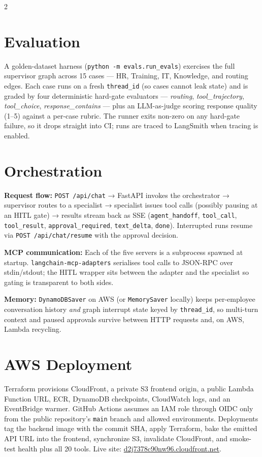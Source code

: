 \documentclass[10pt,a4paper]{article}
\begin{document}
\begin{multicols}{2}
\section{Evaluation}

A golden-dataset harness (\texttt{python -m evals.run\_evals}) exercises the full supervisor graph across 15 cases — HR, Training, IT, Knowledge, and routing edges. Each case runs on a fresh \texttt{thread\_id} (so cases cannot leak state) and is graded by four deterministic hard-gate evaluators — \textit{routing}, \textit{tool\_trajectory}, \textit{tool\_choice}, \textit{response\_contains} — plus an LLM-as-judge scoring response quality (1–5) against a per-case rubric. The runner exits non-zero on any hard-gate failure, so it drops straight into CI; runs are traced to LangSmith when tracing is enabled.

\section{Orchestration}

\textbf{Request flow:} \texttt{POST /api/chat} → FastAPI invokes the orchestrator → supervisor routes to a specialist → specialist issues tool calls (possibly pausing at an HITL gate) → results stream back as SSE (\texttt{agent\_handoff}, \texttt{tool\_call}, \texttt{tool\_result}, \texttt{approval\_required}, \texttt{text\_delta}, \texttt{done}). Interrupted runs resume via \texttt{POST /api/chat/resume} with the approval decision.

\textbf{MCP communication:} Each of the five servers is a subprocess spawned at startup. \texttt{langchain-mcp-adapters} serialises tool calls to JSON-RPC over stdin/stdout; the HITL wrapper sits between the adapter and the specialist so gating is transparent to both sides.

\textbf{Memory:} \texttt{DynamoDBSaver} on AWS (or \texttt{MemorySaver} locally) keeps per-employee conversation history \textit{and} graph interrupt state keyed by \texttt{thread\_id}, so multi-turn context and paused approvals survive between HTTP requests and, on AWS, Lambda recycling.

\section{AWS Deployment}

Terraform provisions CloudFront, a private S3 frontend origin, a public Lambda Function URL, ECR, DynamoDB checkpoints, CloudWatch logs, and an EventBridge warmer. GitHub Actions assumes an IAM role through OIDC only from the public repository's \texttt{main} branch and allowed environments. Deployments tag the backend image with the commit SHA, apply Terraform, bake the emitted API URL into the frontend, synchronize S3, invalidate CloudFront, and smoke-test health plus all 20 tools. Live site: \href{https://d2j7378c90nw96.cloudfront.net}{d2j7378c90nw96.cloudfront.net}.


\end{multicols}
\end{document}
